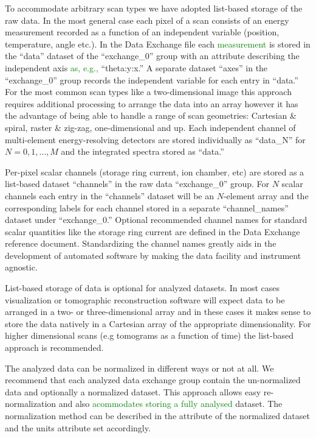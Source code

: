 \documentclass[pdf]{iucr}              %
\begin{document}
To accommodate arbitrary scan types we have adopted list-based storage of the raw data. In the most general case each pixel of a scan consists of an energy measurement recorded as a function of an independent variable (position, temperature, angle etc.). In the Data Exchange file each \textcolor{green}{measurement} is stored in the ``data'' dataset of the ``exchange\_0'' group with an attribute describing the independent axis \textcolor{green}{as, e.g.,} ``theta:y:x.'' A separate dataset ``axes'' in the ``exchange\_0'' group records the independent variable for each entry in ``data.'' For the most common scan types like a two-dimensional image this approach requires additional processing to arrange the data into an array however it has the advantage of being able to handle a range of scan geometries: Cartesian \& spiral, raster \& zig-zag, one-dimensional and up. Each independent channel of multi-element energy-resolving detectors are stored individually as ``data\_N'' for $N=0,1,\ldots,M$ and the integrated spectra stored as ``data.''

Per-pixel scalar channels (storage ring current, ion chamber\textcolor{green}{,} etc) are stored as a list-based dataset ``channels'' in the raw data ``exchange\_0'' group. For $N$ scalar channels each entry in the ``channels'' dataset will be an $N$-element array and the corresponding labels for each channel stored in a separate ``channel\_names'' dataset under ``exchange\_0.'' Optional recommended channel names for standard scalar quantities like the storage ring current are defined in the Data Exchange reference document. Standardizing the channel names greatly aids in the development of automated software by making the data facility and instrument agnostic. 

List-based storage of data is optional for analyzed datasets. In most cases visualization or tomographic reconstruction software will expect data to be arranged in a two- or three-dimensional array and in these cases it makes sense to store the data natively in a Cartesian array of the appropriate dimensionality. For higher dimensional scans (e.g tomograms as a function of time) the list-based approach is recommended.

The analyzed data can be normalized in different ways or not at all. We recommend that each analyzed data exchange group contain the un-normalized data and optionally a normalized dataset. This approach allows easy re-normalization and also \textcolor{green}{acommodates storing a fully analysed} dataset. The normalization method can be described in the attribute of the normalized dataset and the units attribute set accordingly.
\end{document}
